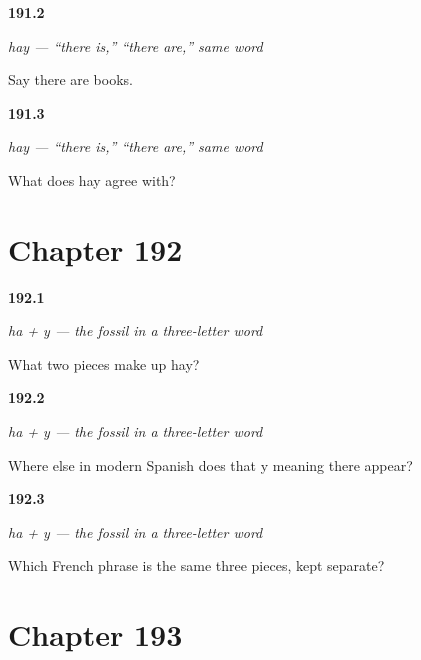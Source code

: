 \noindent\begin{minipage}[t]{\linewidth}
\raggedright
\hypertarget{review-ES-C54-hay-many}{\textbf{191.2}} \emph{hay — \textquotedblleft{}there is,\textquotedblright{} \textquotedblleft{}there are,\textquotedblright{} same word}\par
\small Say there are books.
\end{minipage}\par\medskip

\noindent\begin{minipage}[t]{\linewidth}
\raggedright
\hypertarget{review-ES-C54-hay-unique}{\textbf{191.3}} \emph{hay — \textquotedblleft{}there is,\textquotedblright{} \textquotedblleft{}there are,\textquotedblright{} same word}\par
\small What does hay agree with?
\end{minipage}\par\medskip

\section*{Chapter 192}

\noindent\begin{minipage}[t]{\linewidth}
\raggedright
\hypertarget{review-ES-C54-ha-mas-y-parts}{\textbf{192.1}} \emph{ha + y — the fossil in a three-letter word}\par
\small What two pieces make up hay?
\end{minipage}\par\medskip

\noindent\begin{minipage}[t]{\linewidth}
\raggedright
\hypertarget{review-ES-C54-ha-mas-y-fossil}{\textbf{192.2}} \emph{ha + y — the fossil in a three-letter word}\par
\small Where else in modern Spanish does that y meaning there appear?
\end{minipage}\par\medskip

\noindent\begin{minipage}[t]{\linewidth}
\raggedright
\hypertarget{review-ES-C54-ha-mas-y-french}{\textbf{192.3}} \emph{ha + y — the fossil in a three-letter word}\par
\small Which French phrase is the same three pieces, kept separate?
\end{minipage}\par\medskip

\section*{Chapter 193}

